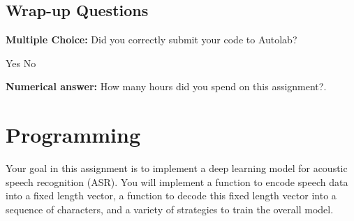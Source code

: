 \documentclass[11pt,addpoints,answers]{exam}
\numberwithin{equation}{section} %
\numberwithin{figure}{section} %
\numberwithin{table}{section} %
\begin{document}
\begin{questions}
\end{questions}

\subsection{Wrap-up Questions}

\begin{questions}


\question[1] \textbf{Multiple Choice:} Did you correctly submit your code to Autolab?
    \begin{checkboxes}
     \choice Yes 
     \choice No
    \end{checkboxes}

\question[1] \textbf{Numerical answer:} How many hours did you spend on this assignment?.
    \begin{tcolorbox}[fit,height=1cm, width=2cm, blank, borderline={1pt}{-2pt}]
    \end{tcolorbox}

\end{questions}
\clearpage

\section{Programming}
\label{sec:code}

Your goal in this assignment is to implement a deep learning model for acoustic speech recognition (ASR). You will implement a function to encode speech data into a fixed length vector, a function to decode this fixed length vector into a sequence of characters, and a variety of strategies to train the overall model. 
\end{document}
